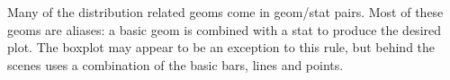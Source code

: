 % 


Many of the distribution related geoms come in geom/stat pairs.  Most of these geoms are aliases: a basic geom is combined with a stat to produce the desired plot.  The boxplot may appear to be an exception to this rule, but behind the scenes  uses a combination of the basic bars, lines and points.


